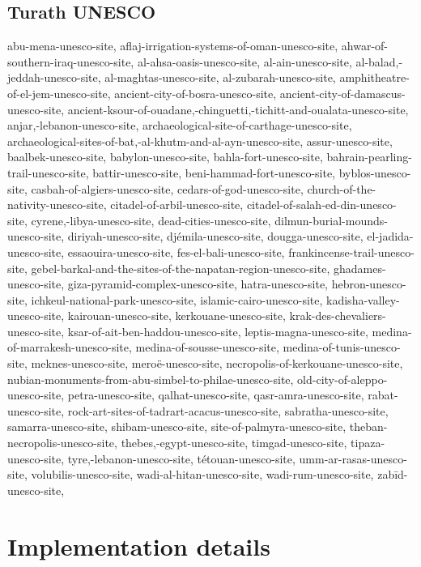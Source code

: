 \documentclass{article}
\begin{document}
\subsection{Turath UNESCO}

abu-mena-unesco-site,
aflaj-irrigation-systems-of-oman-unesco-site,
ahwar-of-southern-iraq-unesco-site,
al-ahsa-oasis-unesco-site,
al-ain-unesco-site,
al-balad,-jeddah-unesco-site,
al-maghtas-unesco-site,
al-zubarah-unesco-site,
amphitheatre-of-el-jem-unesco-site,
ancient-city-of-bosra-unesco-site,
ancient-city-of-damascus-unesco-site,
ancient-ksour-of-ouadane,-chinguetti,-tichitt-and-oualata-unesco-site,
anjar,-lebanon-unesco-site,
archaeological-site-of-carthage-unesco-site,
archaeological-sites-of-bat,-al-khutm-and-al-ayn-unesco-site,
assur-unesco-site,
baalbek-unesco-site,
babylon-unesco-site,
bahla-fort-unesco-site,
bahrain-pearling-trail-unesco-site,
battir-unesco-site,
beni-hammad-fort-unesco-site,
byblos-unesco-site,
casbah-of-algiers-unesco-site,
cedars-of-god-unesco-site,
church-of-the-nativity-unesco-site,
citadel-of-arbil-unesco-site,
citadel-of-salah-ed-din-unesco-site,
cyrene,-libya-unesco-site,
dead-cities-unesco-site,
dilmun-burial-mounds-unesco-site,
diriyah-unesco-site,
djémila-unesco-site,
dougga-unesco-site,
el-jadida-unesco-site,
essaouira-unesco-site,
fes-el-bali-unesco-site,
frankincense-trail-unesco-site,
gebel-barkal-and-the-sites-of-the-napatan-region-unesco-site,
ghadames-unesco-site,
giza-pyramid-complex-unesco-site,
hatra-unesco-site,
hebron-unesco-site,
ichkeul-national-park-unesco-site,
islamic-cairo-unesco-site,
kadisha-valley-unesco-site,
kairouan-unesco-site,
kerkouane-unesco-site,
krak-des-chevaliers-unesco-site,
ksar-of-ait-ben-haddou-unesco-site,
leptis-magna-unesco-site,
medina-of-marrakesh-unesco-site,
medina-of-sousse-unesco-site,
medina-of-tunis-unesco-site,
meknes-unesco-site,
meroë-unesco-site,
necropolis-of-kerkouane-unesco-site,
nubian-monuments-from-abu-simbel-to-philae-unesco-site,
old-city-of-aleppo-unesco-site,
petra-unesco-site,
qalhat-unesco-site,
qasr-amra-unesco-site,
rabat-unesco-site,
rock-art-sites-of-tadrart-acacus-unesco-site,
sabratha-unesco-site,
samarra-unesco-site,
shibam-unesco-site,
site-of-palmyra-unesco-site,
theban-necropolis-unesco-site,
thebes,-egypt-unesco-site,
timgad-unesco-site,
tipaza-unesco-site,
tyre,-lebanon-unesco-site,
tétouan-unesco-site,
umm-ar-rasas-unesco-site,
volubilis-unesco-site,
wadi-al-hitan-unesco-site,
wadi-rum-unesco-site,
zabīd-unesco-site,


\section{Implementation details}
\label{appendix:implementation_details}
\end{document}
